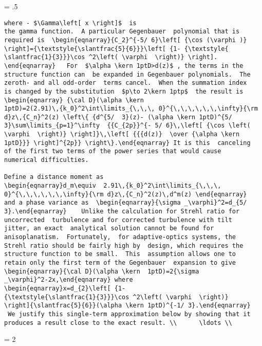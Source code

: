 \newpage
\baselineskip = .5\baselineskip  %
\begin{verbatim}
where - $\Gamma\left[ x \right]$  is
the gamma function.  A particular Gegenbauer  polynomial that is
required is  \begin{eqnarray}{C_2}^{-5/ 6}\left[ {\cos (\varphi )}
\right]={\textstyle{\slantfrac{5}{6}}}\left[ {1- {\textstyle{
\slantfrac{1}{3}}}\cos ^2\left( \varphi  \right)} \right].
\end{eqnarray}   For  $\alpha \kern 1ptD>d(z)$ , the terms in the
structure function can  be expanded in Gegenbauer polynomials.  The
zeroth- and all odd-order  terms cancel.  When the summation index
is changed by the substitution  $p\to 2\kern 1ptp$  the result is
\begin{eqnarray} {\cal D}(\alpha \kern
1ptD)=2(2.91)\,{k_0}^2\int\limits_{\,\,\, 0}^{\,\,\,\,\,\,\infty}{\rm
d}z\,{C_n}^2(z) \left\{ {d^{5/  3}(z)- (\alpha \kern 1ptD)^{5/
3}\sum\limits_{p=1}^\infty  {{C_{2p}}^{- 5/ 6}\,\left[ {\cos \left(
\varphi  \right)} \right]}\,\left[ {{{d(z)}  \over {\alpha \kern
1ptD}}} \right]^{2p}} \right\}.\end{eqnarray} It is this  canceling
of the first two terms of the power series that would cause
numerical difficulties.

Define a distance moment as
\begin{eqnarray}d_m\equiv  2.91\,{k_0}^2\int\limits_{\,\,\,
0}^{\,\,\,\,\,\,\infty}{\rm d}z\,{C_n}^2(z)\,d^m(z) \end{eqnarray}
and a phase variance as  \begin{eqnarray}{\sigma _\varphi}^2=d_{5/
3}.\end{eqnarray}    Unlike the calculation for Strehl ratio for
uncorrected  turbulence and for corrected turbulence with tilt
jitter, an exact  analytical solution cannot be found for
anisoplanatism.  Fortunately,  for adaptive-optics systems, the
Strehl ratio should be fairly high by  design, which requires the
structure function to be small.  This  assumption allows one to
retain only the first term of the Gegenbauer  expansion to give
\begin{eqnarray}{\cal D}(\alpha \kern  1ptD)=2{\sigma
_\varphi}^2-2x,\end{eqnarray} where
\begin{eqnarray}x=d_{2}\left[ {1-
{\textstyle{\slantfrac{1}{3}}}\cos ^2\left( \varphi  \right)}
\right]{\slantfrac{5}{6}}(\alpha \kern 1ptD)^{-1/ 3}.\end{eqnarray}
 We justify this single-term approximation below by showing that it
produces a result close to the exact result. \\      \ldots \\

\end{verbatim}
\newpage
\baselineskip = 2\baselineskip  %

